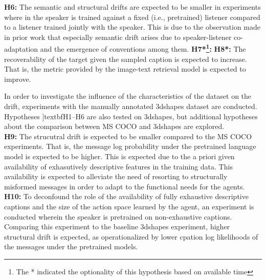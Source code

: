 \textbf{H6:}  The semantic and structural drifts are expected to be smaller in experiments where in the speaker is trained against a fixed (i.e., pretrained) listener compared to a listener trained jointly with the speaker. This is due to the observation made in prior work that especially semantic drift arises due to speaker-listener co-adaptation and the emergence of conventions among them. \newline
\textbf{H7*\footnote{The * indicated the optionality of this hypothesis based on available time}:}  \newline
\textbf{H8*:} The recoverability of the target given the sampled caption is expected to increase. That is, the metric provided by the image-text retrieval model is expected to improve.  \newline

In order to investigate the influence of the characteristics of the dataset on the drift, experiments with the manually annotated 3dshapes dataset are conducted. Hypotheses ]textbf{H1--H6} are also tested on 3dshapes, but additional hypotheses about the comparison between MS COCO and 3dshapes are explored. \\
\newline
\textbf{H9:} The strucutral drift is expected to be smaller compared to the MS COCO experiments. That is, the message log probability under the pretrained language model is expected to be higher. This is expected due to the a priori given availability of exhasutively descriptive features in the training data. This availability is expected to alleviate the need of resorting to structurally misformed messages in order to adapt to the functional needs for the agents. \newline
\textbf{H10:} To deconfound the role of the availability of fully exhaustive descriptive captions and the size of the action space learned by the agent, an experiment is conducted wherein the speaker is pretrained on non-exhaustive captions. Comparing this experiment to the baseline 3dshapes experiment, higher structural drift is expected, as operationalized by lower cpation log likelihoods of the messages under the pretrained models.

